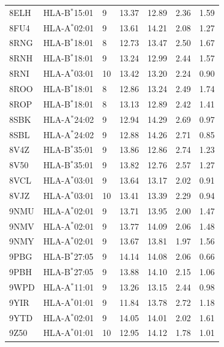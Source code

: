 \begin{longtable}{lllrrrr}
8ELH & HLA-B$^{*}$15:01 & 9 & 13.37 & 12.89 & 2.36 & 1.59\\
8FU4 & HLA-A$^{*}$02:01 & 9 & 13.61 & 14.21 & 2.08 & 1.27\\
8RNG & HLA-B$^{*}$18:01 & 8 & 12.73 & 13.47 & 2.50 & 1.67\\
8RNH & HLA-B$^{*}$18:01 & 9 & 13.24 & 12.99 & 2.44 & 1.57\\
8RNI & HLA-A$^{*}$03:01 & 10 & 13.42 & 13.20 & 2.24 & 0.90\\
8ROO & HLA-B$^{*}$18:01 & 8 & 12.86 & 13.24 & 2.49 & 1.74\\
8ROP & HLA-B$^{*}$18:01 & 8 & 13.13 & 12.89 & 2.42 & 1.41\\
8SBK & HLA-A$^{*}$24:02 & 9 & 12.94 & 14.29 & 2.69 & 0.97\\
8SBL & HLA-A$^{*}$24:02 & 9 & 12.88 & 14.26 & 2.71 & 0.85\\
8V4Z & HLA-B$^{*}$35:01 & 9 & 13.86 & 12.86 & 2.74 & 1.23\\
8V50 & HLA-B$^{*}$35:01 & 9 & 13.82 & 12.76 & 2.57 & 1.27\\
8VCL & HLA-A$^{*}$03:01 & 9 & 13.64 & 13.17 & 2.02 & 0.91\\
8VJZ & HLA-A$^{*}$03:01 & 10 & 13.41 & 13.39 & 2.29 & 0.94\\
9NMU & HLA-A$^{*}$02:01 & 9 & 13.71 & 13.95 & 2.00 & 1.47\\
9NMV & HLA-A$^{*}$02:01 & 9 & 13.77 & 14.09 & 2.06 & 1.48\\
9NMY & HLA-A$^{*}$02:01 & 9 & 13.67 & 13.81 & 1.97 & 1.56\\
9PBG & HLA-B$^{*}$27:05 & 9 & 14.14 & 14.08 & 2.06 & 0.66\\
9PBH & HLA-B$^{*}$27:05 & 9 & 13.88 & 14.10 & 2.15 & 1.06\\
9WPD & HLA-A$^{*}$11:01 & 9 & 13.26 & 13.15 & 2.44 & 0.98\\
9YIR & HLA-A$^{*}$01:01 & 9 & 11.84 & 13.78 & 2.72 & 1.18\\
9YTD & HLA-A$^{*}$02:01 & 9 & 14.05 & 14.01 & 2.02 & 1.61\\
9Z50 & HLA-A$^{*}$01:01 & 10 & 12.95 & 14.12 & 1.78 & 1.01\\
\hline\end{longtable}

